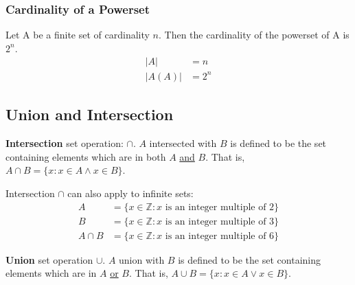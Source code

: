 \subsubsection{Cardinality of a Powerset}

Let A be a finite set of cardinality $n$. Then the cardinality of the powerset of A is $2^n$.
\begin{align*}
  \left\lvert A\right\rvert    & = n   \\
  \left\lvert A(A)\right\rvert & = 2^n
\end{align*}

\subsection{Union and Intersection}

\textbf{Intersection} set operation: $\cap$.
$A$ intersected with $B$ is defined to be the set containing elements which are in both $A$ \underline{and} $B$.
That is, $A \cap B = \{x: x \in A \land x \in B\}$.
\begin{center}
\end{center}

Intersection $\cap$ can also apply to infinite sets:
\begin{align*}
  A        & =\{x \in \mathbb{Z}: x \text{ is an integer multiple of 2}\}  \\
  B        & =\{x \in \mathbb{Z}: x \text{ is an integer multiple of 3}\}  \\
  A \cap B & = \{x \in \mathbb{Z}: x \text{ is an integer multiple of 6}\}
\end{align*}

\noindent \textbf{Union} set operation $\cup$.
$A$ union with $B$ is defined to be the set containing elements which are in $A$ \underline{or} $B$.
That is, $A \cup B = \{x: x \in A \lor x \in B\}$.
\begin{center}
\end{center}

